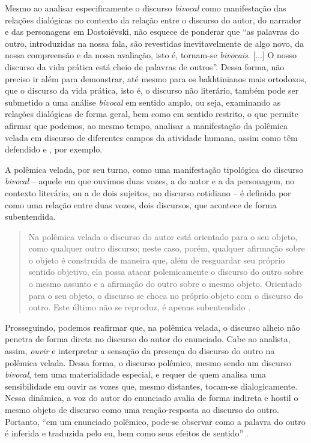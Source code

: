 \documentclass[portuguese]{textolivre}
\begin{document}
Mesmo ao analisar especificamente o discurso \textit{bivocal} como manifestação das relações dialógicas no contexto da relação entre o discurso do autor, do narrador e das personagens em Dostoiévski, \textcite[p. 223, grifos meus]{bakhtin2018problemas} não esquece de ponderar que “as palavras do outro, introduzidas na nossa fala, são revestidas inevitavelmente de algo novo, da nossa compreensão e da nossa avaliação, isto é, tornam-se \textit{bivocais}. [...] O nosso discurso da vida prática está cheio de palavras de outros”. Dessa forma, não preciso ir além para demonstrar, até mesmo para os bakhtinianos mais ortodoxos, que o discurso da vida prática, isto é, o discurso não literário, também pode ser submetido a uma análise \textit{bivocal} em sentido amplo, ou seja, examinando as relações dialógicas de forma geral, bem como em sentido restrito, o que permite afirmar que podemos, ao mesmo tempo, analisar a manifestação da polêmica velada em discurso de diferentes campos da atividade humana, assim como têm defendido \textcite{silva2019analise} e \textcite{campos2021concepcao}, por exemplo.
	
A polêmica velada, por seu turno, como uma manifestação tipológica do discurso \textit{bivocal} – aquele em que ouvimos duas vozes, a do autor e a da personagem, no contexto literário, ou a de dois sujeitos, no discurso cotidiano – é definida por \textcite{bakhtin2018problemas} como uma relação entre duas vozes, dois discursos, que acontece de forma subentendida.

\begin{quote}
Na polêmica velada o discurso do autor está orientado para o seu objeto, como qualquer outro discurso; neste caso, porém, qualquer afirmação sobre o objeto é construída de maneira que, além de resguardar seu próprio sentido objetivo, ela possa atacar polemicamente o discurso do outro sobre o mesmo assunto e a afirmação do outro sobre o mesmo objeto. Orientado para o seu objeto, o discurso se choca no próprio objeto com o discurso do outro. Este último não se reproduz, é apenas subentendido \cite[p.~224]{bakhtin2018problemas}.
\end{quote}
 
Prosseguindo, podemos reafirmar que, na polêmica velada, o discurso alheio não penetra de forma direta no discurso do autor do enunciado. Cabe ao analista, assim, \textit{ouvir} e interpretar a sensação da presença do discurso do outro na polêmica velada. Dessa forma, o discurso polêmico, mesmo sendo um discurso \textit{bivocal}, tem uma materialidade especial, e requer de quem analisa uma sensibilidade em ouvir as vozes que, mesmo distantes, tocam-se dialogicamente. Nessa dinâmica, a voz do autor do enunciado avalia de forma indireta e hostil o mesmo objeto de discurso como uma reação-resposta ao discurso do outro. Portanto, “em um enunciado polêmico, pode-se observar como a palavra do outro é inferida e traduzida pelo eu, bem como seus efeitos de sentido” \cite[p.~161]{silva2019analise}.
\end{document}
